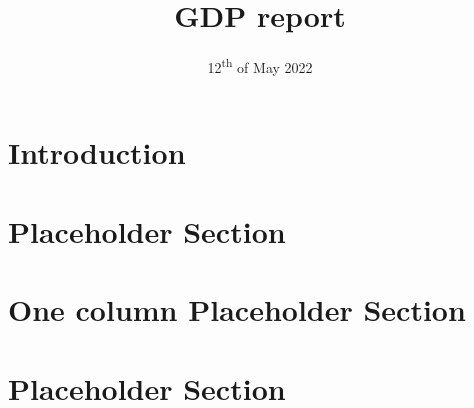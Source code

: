 \documentclass{article}
\title{GDP report}
\date{12\textsuperscript{th} of May 2022}
\begin{document}



\tableofcontents

\section{Introduction}


\section{Placeholder Section}


\onecolumn
\section{One column Placeholder Section}

\twocolumn

\section{Placeholder Section}

\end{document}
